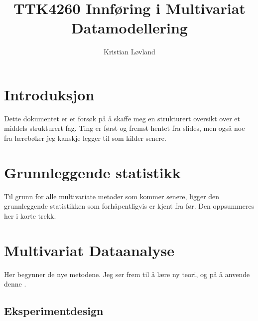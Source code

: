 \documentclass[12pt]{article}
\title{TTK4260 Innføring i Multivariat Datamodellering}
\date{}
\author{Kristian Løvland}
\begin{document}
\maketitle
\tableofcontents

\newpage
\section{Introduksjon}
Dette dokumentet er et forsøk på å skaffe meg en strukturert oversikt over et middels strukturert fag. Ting er først og fremst hentet fra slides, men også noe fra lærebøker jeg kanskje legger til som kilder senere.

\newpage
\section{Grunnleggende statistikk}
Til grunn for alle multivariate metoder som kommer senere, ligger den grunnleggende statistikken som forhåpentligvis er kjent fra før. Den oppsummeres her i korte trekk.









\newpage
\section{Multivariat Dataanalyse}
Her begynner de nye metodene. Jeg ser frem til å lære ny teori, og på å anvende denne \Cooley.

\subsection{Eksperimentdesign}
\end{document}
